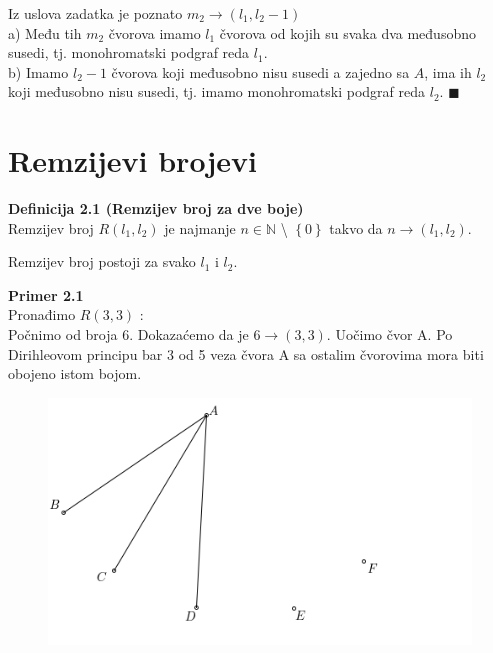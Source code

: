 \documentclass[12pt,a4paper]{article}
\begin{document}
	Iz uslova zadatka je poznato $m_{2} \rightarrow (l_{1}, l_{2}-1)$\\
	\indent a) Među tih $m_{2}$ čvorova imamo $l_{1}$ čvorova od kojih su svaka dva međusobno susedi, tj. monohromatski podgraf reda $l_{1}$.\\
	\indent b) Imamo $l_{2}-1$ čvorova koji međusobno nisu susedi a zajedno sa $A$, ima ih $l_{2}$ koji međusobno nisu susedi, tj. imamo monohromatski podgraf reda $l_{2}$. \hspace{0.5em}$\blacksquare$\\
	
	
	
	
	\section{Remzijevi brojevi}
	\vspace{1em}
	\begin{mdframed}
	{\fontsize{12pt}{12pt}\textbf{Definicija 2.1 (Remzijev broj za dve boje)}}
	\vspace{0.5em}	
	\\
	Remzijev broj $R(l_{1}, l_{2})$ je najmanje $n \in \mathbb{N}$ \textbackslash {} $\left\lbrace 0\right\rbrace $ takvo da $n\rightarrow(l_{1}, l_{2})$.
	\end{mdframed}
	
	\noindent Remzijev broj postoji za svako $l_1$ i $l_2$.
	
	\vspace{0.7em}
	
	{\noindent\fontsize{12pt}{12pt}\textbf{Primer 2.1}}
	\vspace{0.5em}
	\\	
	Pronađimo $R(3,3)$ :
	\\Počnimo od broja 6. Dokazaćemo da je $6 \rightarrow (3, 3)$. Uočimo čvor A. Po Dirihleovom principu bar 3 od 5 veza čvora A sa ostalim čvorovima mora biti obojeno istom bojom. 
	\begin{figure}[h]
	\centering
	\includegraphics[scale=2.3]{r33.png}
	\end{figure}
	
\end{document}
